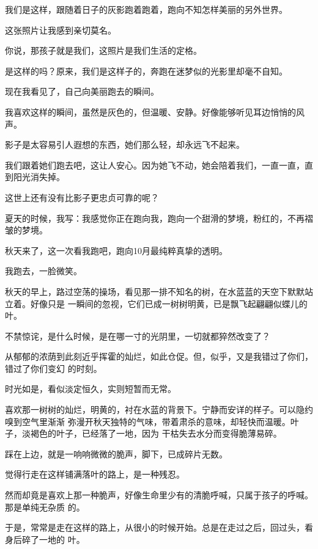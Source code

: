 	\endwriting



		我们是这样，跟随着日子的灰影跑着跑着，跑向不知怎样美丽的另外世界。

		这张照片让我感到亲切莫名。

		你说，那孩子就是我们，这照片是我们生活的定格。

		是这样的吗？原来，我们是这样子的，奔跑在迷梦似的光影里却毫不自知。

		现在我看见了，自己向美丽跑去的瞬间。

		我喜欢这样的瞬间，虽然是灰色的，但温暖、安静。好像能够听见耳边悄悄的风声。

		影子是太容易引人遐想的东西，她们那么轻，却永远飞不起来。

		我们跟着她们跑去吧，这让人安心。因为她飞不动，她会陪着我们，一直一直，直到阳光消失掉。

		这世上还有没有比影子更忠贞可靠的呢？

		夏天的时候，我写：我感觉你正在跑向我，跑向一个甜滑的梦境，粉红的，不再褶皱的梦境。

		秋天来了，这一次看我跑吧，跑向10月最纯粹真挚的透明。

		我跑去，一脸微笑。

	\endwriting


		秋天的早上，路过空荡的操场，看见那一排不知名的树，在水蓝蓝的天空下默默站立着。好像只是
	一瞬间的忽视，它们已成一树树明黄，已是飘飞起翩翩似蝶儿的叶。

		不禁惊诧，是什么时候，是在哪一寸的光阴里，一切就都猝然改变了？

		从郁郁的浓荫到此刻近乎挥霍的灿烂，如此仓促。但，似乎，又是我错过了你们，错过了你们变幻
	的时刻。

		时光如是，看似淡定恒久，实则短暂而无常。

		喜欢那一树树的灿烂，明黄的，衬在水蓝的背景下。宁静而安详的样子。可以隐约嗅到空气里渐渐
	弥漫开秋天独特的气味，带着肃杀的意味，却轻快而温暖。叶子，淡褐色的叶子，已经落了一地，因为
	干枯失去水分而变得脆薄易碎。

		踩在上边，就是一响响微微的脆声，脚下，已成碎片无数。

		觉得行走在这样铺满落叶的路上，是一种残忍。

		然而却竟是喜欢上那一种脆声，好像生命里少有的清脆呼喊，只属于孩子的呼喊。那是单纯无杂质
	的。

		于是，常常是走在这样的路上，从很小的时候开始。总是在走过之后，回过头，看身后碎了一地的
	叶。


